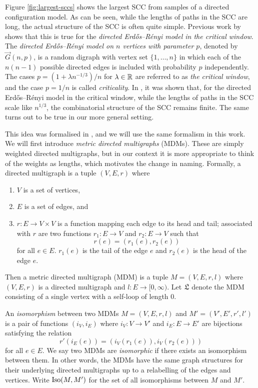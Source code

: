 Figure \ref{fig:largest-sccs} shows the largest SCC from samples of a directed configuration model. As can be seen, while the lengths of paths in the SCC are long, the actual structure of the SCC is often quite simple. Previous work by \citet{goldschmidtScalingLimitCritical2019} shows that this is true for the \emph{directed Erdős--Rényi model in the critical window}. The \emph{directed Erd\H{o}s--Rényi model on $n$ vertices with parameter $p$}, denoted by $\vec{G}(n,p)$, is a random digraph with vertex set $\{1,\dots, n\}$ in which each of the $n(n-1)$ possible directed edges is included with probability $p$ independently. The cases $p=(1+\lambda n^{-1/3})/n$ for $\lambda\in{\mathbb R}$ are referred to as \emph{the critical window}, and the case $p=1/n$ is called \emph{criticality}. In \cite{goldschmidtScalingLimitCritical2019}, it was shown that, for the directed Erdős--Rényi model in the critical window, while the lengths of paths in the SCC scale like $n^{1/3}$, the combinatorial structure of the SCC remains finite. The same turns out to be true in our more general setting.

This idea was formalised in \cite{goldschmidtScalingLimitCritical2019}, and we will use the same formalism in this work. We will first introduce \emph{metric directed multigraphs} (MDMs). These are simply weighted directed multigraphs, but in our context it is more appropriate to think of the weights as lengths, which motivates the change in naming. Formally, a directed multigraph is a tuple $(V, E, r)$ where
\begin{enumerate}
    \item $V$ is a set of vertices,
    \item $E$ is a set of edges, and
    \item $r: E \to V \times V$ is a function mapping each edge to its head and tail; associated with $r$ are two functions $r_1: E \to V$ and $r_2: E \to V$ such that
\begin{equation*}
    r(e) = (r_1(e), r_2(e))
\end{equation*}
for all $e \in E$. $r_1(e)$ is the tail of the edge $e$ and $r_2(e)$ is the head of the edge $e$.
\end{enumerate}
 Then a metric directed multigraph (MDM) is a tuple $M = (V, E, r, l)$ where $(V, E, r)$ is a directed multigraph and $l:E \to [0, \infty)$. Let $\mathfrak L$ denote the MDM consisting of a single vertex with a self-loop of length 0.

An \emph{isomorphism} between two MDMs $M = (V, E, r, l)$ and $M' = (V', E', r', l')$ is a pair of functions $(i_V, i_E)$ where $i_V: V \to V'$ and $i_E: E \to E'$ are bijections satisfying the relation
\begin{equation*}
    r'(i_E(e)) = (i_V(r_1(e)), i_V(r_2(e)))
\end{equation*}
for all $e \in E$. We say two MDMs are \emph{isomorphic} if there exists an isomorphism between them. In other words, the MDMs have the same graph structures for their underlying directed multigraphs up to a relabelling of the edges and vertices. Write $\operatorname{Iso}(M, M')$ for the set of all isomorphisms between $M$ and $M'$.

